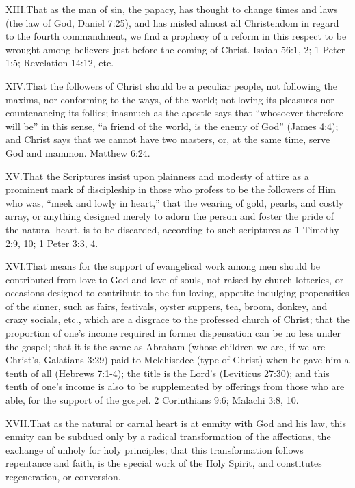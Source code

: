 \lettrine{XIII.} That as the man of sin, the papacy, has thought to change times and laws (the law of God, Daniel 7:25), and has misled almost all Christendom in regard to the fourth commandment, we find a prophecy of a reform in this respect to be wrought among believers just before the coming of Christ. Isaiah 56:1, 2; 1 Peter 1:5; Revelation 14:12, etc.

\lettrine{XIV.} That the followers of Christ should be a peculiar people, not following the maxims, nor conforming to the ways, of the world; not loving its pleasures nor countenancing its follies; inasmuch as the apostle says that “whosoever therefore will be” in this sense, “a friend of the world, is the enemy of God” (James 4:4); and Christ says that we cannot have two masters, or, at the same time, serve God and mammon. Matthew 6:24.

\lettrine{XV.} That the Scriptures insist upon plainness and modesty of attire as a prominent mark of discipleship in those who profess to be the followers of Him who was, “meek and lowly in heart,” that the wearing of gold, pearls, and costly array, or anything designed merely to adorn the person and foster the pride of the natural heart, is to be discarded, according to such scriptures as 1 Timothy 2:9, 10; 1 Peter 3:3, 4.

\lettrine{XVI.} That means for the support of evangelical work among men should be contributed from love to God and love of souls, not raised by church lotteries, or occasions designed to contribute to the fun-loving, appetite-indulging propensities of the sinner, such as fairs, festivals, oyster suppers, tea, broom, donkey, and crazy socials, etc., which are a disgrace to the professed church of Christ; that the proportion of one’s income required in former dispensation can be no less under the gospel; that it is the same as Abraham (whose children we are, if we are Christ’s, Galatians 3:29) paid to Melchisedec (type of Christ) when he gave him a tenth of all (Hebrews 7:1-4); the title is the Lord’s (Leviticus 27:30); and this tenth of one’s income is also to be supplemented by offerings from those who are able, for the support of the gospel. 2 Corinthians 9:6; Malachi 3:8, 10.

\lettrine{XVII.} That as the natural or carnal heart is at enmity with God and his law, this enmity can be subdued only by a radical transformation of the affections, the exchange of unholy for holy principles; that this transformation follows repentance and faith, is the special work of the Holy Spirit, and constitutes regeneration, or conversion.

